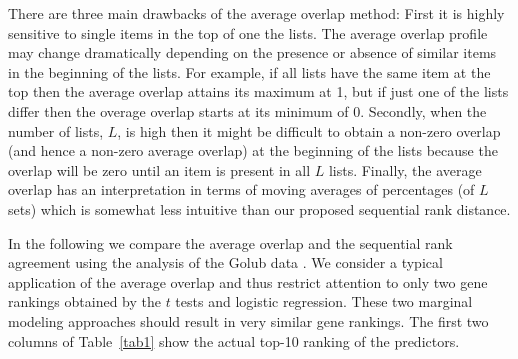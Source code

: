 \documentclass[12pt,a4paper]{article}
\theoremstyle{plain}
\begin{document}
There are three main drawbacks of the average overlap method: First it
is highly sensitive to single items in the top of one the lists.  The
average overlap profile may change dramatically depending on the
presence or absence of similar items in the beginning of the
lists. For example, if all lists have the same item at the top then
the average overlap attains its maximum at 1, but if just one of the
lists differ then the overage overlap starts at its minimum of
0. Secondly, when the number of lists, $L$, is high then it might be
difficult to obtain a non-zero overlap (and hence a non-zero average
overlap) at the beginning of the lists because the overlap will be
zero until an item is present in all $L$ lists. Finally, the average
overlap has an interpretation in terms of moving averages of
percentages (of $L$ sets) which is somewhat less intuitive than our
proposed sequential rank distance.

In the following we compare the average overlap and the sequential
rank agreement using the analysis of the Golub data
\citep{Golub1999}. We consider a typical application of the average
overlap and thus restrict attention to only two gene rankings obtained
by the $t$ tests and logistic regression. These two marginal modeling
approaches should result in very similar gene rankings. The first two
columns of Table~\ref{tab1} show the actual top-10 ranking of the
predictors.

\end{document}
